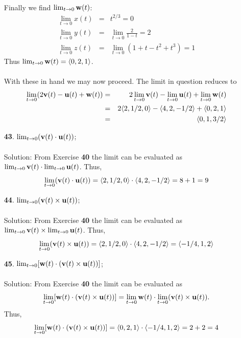 \documentclass[12pt]{amsbook}
\newcommand{\la}{\langle}
\newcommand{\ra}{\rangle}
\begin{document}
\begin{enumerate}
  \\
  Finally we find $\lim_{t\rightarrow 0}{\bf w}(t)$:
  \begin{eqnarray*}
  \lim_{t\rightarrow 0}x(t)&=&t^{2/3}=0\\
  \lim_{t\rightarrow 0}y(t)&=&\lim_{t\rightarrow 0}\frac{2}{1-t}=2\\
  \lim_{t\rightarrow 0}z(t)&=&\lim_{t\rightarrow 0}(1+t-t^2+t^3)=1
  \end{eqnarray*}
  Thus $\lim_{t\rightarrow 0}{\bf w}(t)=\la 0,2,1 \ra$.
  \\
  \\
  With these in hand we may now proceed. The limit in question reduces to
\begin{eqnarray*}
\lim_{t\rightarrow 0}(2{\bf v}(t)-{\bf u}(t)+{\bf w}(t))&=&2\lim_{t\rightarrow 0}{\bf v}(t)-\lim_{t\rightarrow 0}{\bf u}(t)+\lim_{t\rightarrow 0}{\bf w}(t)\\
&=&2\la 2,1/2,0 \ra - \la 4,2,-1/2 \ra + \la 0,2,1 \ra \\
&=& \la 0,1,3/2 \ra 
\end{eqnarray*}  
  \item[{\small\bf 43}.] $\lim_{t\rightarrow 0}({\bf v}(t)\cdot{\bf u}(t))$;
  \\
  \\
  {\sc Solution}: From Exercise {\bf 40} the limit can be evaluated as $\lim_{t\rightarrow 0}{\bf v}(t)\cdot \lim_{t\rightarrow 0}{\bf u}(t)$. Thus,
  $$\lim_{t\rightarrow 0}({\bf v}(t)\cdot{\bf u}(t))=\la 2,1/2,0 \ra \cdot \la 4,2,-1/2 \ra = 8+1=9$$
  \item[{\small\bf 44}.] $\lim_{t\rightarrow 0}({\bf v}(t)\times{\bf u}(t))$;
  \\
  \\
  {\sc Solution}: From Exercise {\bf 40} the limit can be evaluated as $\lim_{t\rightarrow 0}{\bf v}(t)\times \lim_{t\rightarrow 0}{\bf u}(t)$. Thus,
  $$\lim_{t\rightarrow 0}({\bf v}(t)\times{\bf u}(t))=\la 2,1/2,0 \ra \cdot \la 4,2,-1/2 \ra =\la -1/4, 1, 2 \ra$$
  \item[{\small\bf 45}.] $\lim_{t\rightarrow 0}[{\bf w}(t)\cdot({\bf v}(t)\times{\bf u}(t))]$;
  \\
  \\
  {\sc Solution}: From Exercise {\bf 40} the limit can be evaluated as 
$$\lim_{t\rightarrow 0}[{\bf w}(t)\cdot({\bf v}(t)\times{\bf u}(t))]=\lim_{t\rightarrow 0}{\bf w}(t)\cdot\lim_{t\rightarrow 0}({\bf v}(t)\times{\bf u}(t)).$$  
Thus,
 $$\lim_{t\rightarrow 0}[{\bf w}(t)\cdot({\bf v}(t)\times{\bf u}(t))]=\la 0,2,1 \ra \cdot \la -1/4,1,2 \ra = 2+2=4$$

\end{enumerate}
\end{document}
